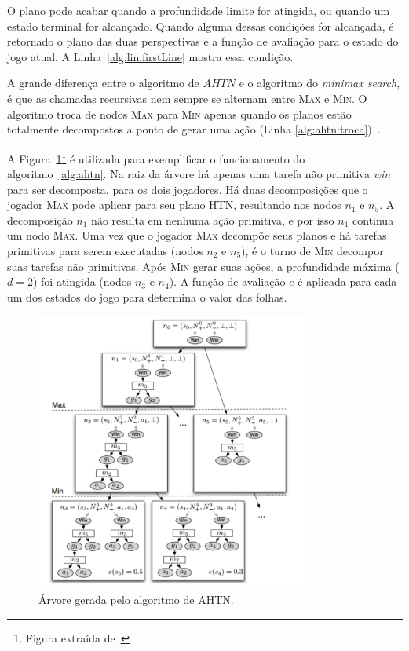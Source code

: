 O plano pode acabar quando a profundidade limite for atingida, ou quando um estado terminal for alcançado.
Quando alguma dessas condições for alcançada, é retornado o plano das duas perspectivas e a função de avaliação para o estado do jogo atual. A Linha~\ref{alg:lin:firstLine} mostra essa condição.

A grande diferença entre o algoritmo de $AHTN$ e o algoritmo do \textit{minimax search}, é que as chamadas recursivas nem sempre se alternam entre \textsc{Max} e \textsc{Min}. 
O algoritmo troca de nodos \textsc{Max} para \textsc{Min} apenas quando os planos estão totalmente decompostos a ponto de gerar uma ação (Linha \ref{alg:ahtn:troca})~\cite{ontanon2015adversarial}.

A Figura~\ref{fig:ahtn}\footnote{Figura extraída de~\cite{ontanon2015adversarial}} é utilizada para exemplificar o funcionamento do algoritmo~\ref{alg:ahtn}. 
Na raiz da árvore há apenas uma tarefa não primitiva \textit{win} para ser decomposta, para os dois jogadores. 
Há duas decomposições que o jogador \textsc{Max} pode aplicar para seu plano HTN, resultando nos nodos $n_{1}$ e $n_{5}$. A decomposição $n_{1}$ não resulta em nenhuma ação primitiva, e por isso $n_{1}$ continua um nodo \textsc{Max}. Uma vez que o jogador \textsc{Max} decompõe seus planos e há tarefas primitivas para serem executadas (nodos $n_{2}$ e $n_{5}$), é o turno de \textsc{Min} decompor suas tarefas não primitivas. Após \textsc{Min} gerar suas ações, a profundidade máxima ($d = 2$) foi atingida (nodos $n_{3}$ e $n_{4}$). 
A função de avaliação $e$ é aplicada para cada um dos estados do jogo para determina o valor das folhas.

\begin{figure}[ht]
	\centering
	\includegraphics[width=0.8\textwidth]{fig/ahtn.pdf} 
	\caption{Árvore gerada pelo algoritmo de AHTN.}
	\label{fig:ahtn}
\end{figure}

